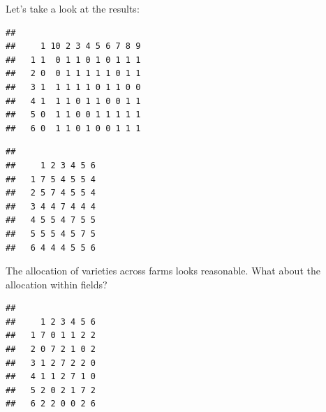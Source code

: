 \documentclass[
]{book}
\newenvironment{Shaded}{\begin{snugshade}}{\end{snugshade}}
\newcommand{\FunctionTok}[1]{\textcolor[rgb]{0.00,0.00,0.00}{#1}}
\newcommand{\NormalTok}[1]{#1}
\newcommand{\SpecialCharTok}[1]{\textcolor[rgb]{0.00,0.00,0.00}{#1}}
\begin{document}
Let's take a look at the results:

\begin{Shaded}
\end{Shaded}

\begin{verbatim}
##    
##     1 10 2 3 4 5 6 7 8 9
##   1 1  0 1 1 0 1 0 1 1 1
##   2 0  0 1 1 1 1 1 0 1 1
##   3 1  1 1 1 1 0 1 1 0 0
##   4 1  1 1 0 1 1 0 0 1 1
##   5 0  1 1 0 0 1 1 1 1 1
##   6 0  1 1 0 1 0 0 1 1 1
\end{verbatim}

\begin{Shaded}
\end{Shaded}

\begin{verbatim}
##    
##     1 2 3 4 5 6
##   1 7 5 4 5 5 4
##   2 5 7 4 5 5 4
##   3 4 4 7 4 4 4
##   4 5 5 4 7 5 5
##   5 5 5 4 5 7 5
##   6 4 4 4 5 5 6
\end{verbatim}

The allocation of varieties across farms looks reasonable. What about the allocation within fields?

\begin{Shaded}
\end{Shaded}

\begin{verbatim}
##    
##     1 2 3 4 5 6
##   1 7 0 1 1 2 2
##   2 0 7 2 1 0 2
##   3 1 2 7 2 2 0
##   4 1 1 2 7 1 0
##   5 2 0 2 1 7 2
##   6 2 2 0 0 2 6
\end{verbatim}
\end{document}
